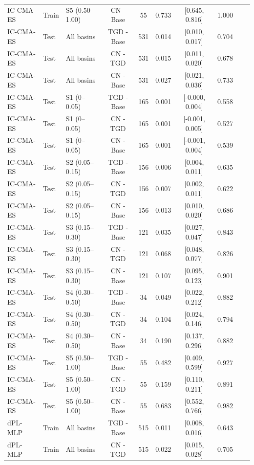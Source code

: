 \begin{table}[t]
\begin{threeparttable}
\begin{tabular}{lllccccccc}
IC-CMA-ES & Train & S5 (0.50–1.00) & CN - Base & 55 & 0.733 & [0.645, 0.816] & 1.000 \\
IC-CMA-ES & Test & All basins & TGD - Base & 531 & 0.014 & [0.010, 0.017] & 0.704 \\
IC-CMA-ES & Test & All basins & CN - TGD & 531 & 0.015 & [0.011, 0.020] & 0.678 \\
IC-CMA-ES & Test & All basins & CN - Base & 531 & 0.027 & [0.021, 0.036] & 0.733 \\
IC-CMA-ES & Test & S1 (0–0.05) & TGD - Base & 165 & 0.001 & [-0.000, 0.004] & 0.558 \\
IC-CMA-ES & Test & S1 (0–0.05) & CN - TGD & 165 & 0.001 & [-0.001, 0.005] & 0.527 \\
IC-CMA-ES & Test & S1 (0–0.05) & CN - Base & 165 & 0.001 & [-0.001, 0.004] & 0.539 \\
IC-CMA-ES & Test & S2 (0.05–0.15) & TGD - Base & 156 & 0.006 & [0.004, 0.011] & 0.635 \\
IC-CMA-ES & Test & S2 (0.05–0.15) & CN - TGD & 156 & 0.007 & [0.002, 0.011] & 0.622 \\
IC-CMA-ES & Test & S2 (0.05–0.15) & CN - Base & 156 & 0.013 & [0.010, 0.020] & 0.686 \\
IC-CMA-ES & Test & S3 (0.15–0.30) & TGD - Base & 121 & 0.035 & [0.027, 0.047] & 0.843 \\
IC-CMA-ES & Test & S3 (0.15–0.30) & CN - TGD & 121 & 0.068 & [0.048, 0.077] & 0.826 \\
IC-CMA-ES & Test & S3 (0.15–0.30) & CN - Base & 121 & 0.107 & [0.095, 0.123] & 0.901 \\
IC-CMA-ES & Test & S4 (0.30–0.50) & TGD - Base & 34 & 0.049 & [0.022, 0.212] & 0.882 \\
IC-CMA-ES & Test & S4 (0.30–0.50) & CN - TGD & 34 & 0.104 & [0.024, 0.146] & 0.794 \\
IC-CMA-ES & Test & S4 (0.30–0.50) & CN - Base & 34 & 0.190 & [0.137, 0.296] & 0.882 \\
IC-CMA-ES & Test & S5 (0.50–1.00) & TGD - Base & 55 & 0.482 & [0.409, 0.599] & 0.927 \\
IC-CMA-ES & Test & S5 (0.50–1.00) & CN - TGD & 55 & 0.159 & [0.110, 0.211] & 0.891 \\
IC-CMA-ES & Test & S5 (0.50–1.00) & CN - Base & 55 & 0.683 & [0.552, 0.766] & 0.982 \\
dPL-MLP & Train & All basins & TGD - Base & 515 & 0.011 & [0.008, 0.016] & 0.643 \\
dPL-MLP & Train & All basins & CN - TGD & 515 & 0.022 & [0.015, 0.028] & 0.705 \\

\end{tabular}
\end{threeparttable}
\end{table}
